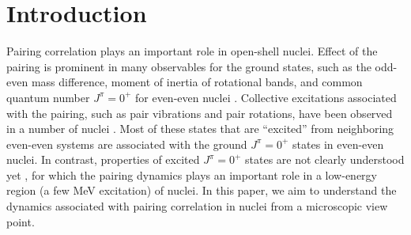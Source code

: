 \documentclass[%
superscriptaddress,
showpacs,
nofootinbib,
amsmath,amssymb,
aps,
prc,
twocolumn,
floatfix ]%
{revtex4-1}
\begin{document}
\maketitle

\section{Introduction}
Pairing correlation plays an important role in open-shell nuclei.
Effect of the pairing is prominent in many observables for the ground states,
such as the odd-even mass difference, moment of inertia of rotational bands,
and common quantum number $J^\pi=0^+$ for even-even nuclei \cite{RS80}.
Collective excitations associated with the pairing, such as
pair vibrations and pair rotations,
have been observed in a number of nuclei \cite{BB05}.
Most of these states that are ``excited'' from neighboring even-even systems
are associated with the ground $J^\pi=0^+$ states in even-even nuclei.
In contrast, properties of excited $J^{\pi}=0^+$ states are not clearly
understood yet \cite{HW11, G01}, for which the pairing dynamics plays
an important role in a low-energy region (a few MeV excitation) of nuclei. 
In this paper,
we aim to understand the dynamics associated with pairing correlation in nuclei
from a microscopic view point.
\end{document}
